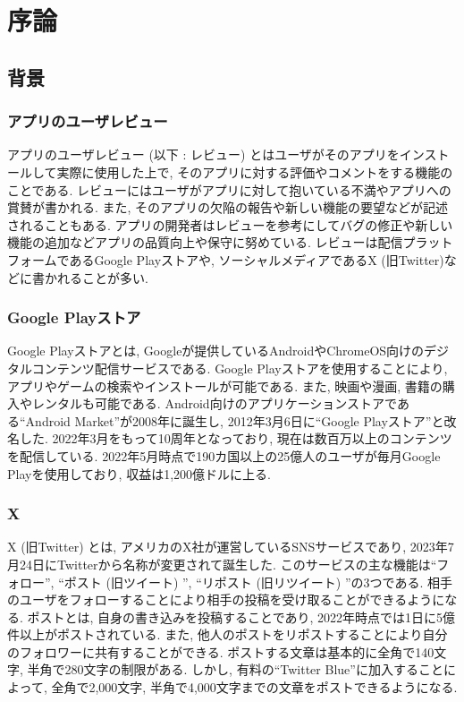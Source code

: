 \chapter{序論}
\label{chap:jyoron}

\section{背景}

\subsection{アプリのユーザレビュー}
アプリのユーザレビュー (以下 : レビュー) とはユーザがそのアプリをインストールして実際に使用した上で, そのアプリに対する評価やコメントをする機能のことである. 
レビューにはユーザがアプリに対して抱いている不満やアプリへの賞賛が書かれる. また, そのアプリの欠陥の報告や新しい機能の要望などが記述されることもある. 
アプリの開発者はレビューを参考にしてバグの修正や新しい機能の追加などアプリの品質向上や保守に努めている. 
レビューは配信プラットフォームであるGoogle Playストアや, ソーシャルメディアであるX (旧Twitter)などに書かれることが多い. 

\subsection{Google Playストア}
Google Playストア\cite{google-play-store}とは, Googleが提供しているAndroidやChromeOS向けのデジタルコンテンツ配信サービスである. Google Playストアを使用することにより, アプリやゲームの検索やインストールが可能である. また, 映画や漫画, 書籍の購入やレンタルも可能である. 
Android向けのアプリケーションストアである``Android Market''が2008年に誕生し, 2012年3月6日に``Google Playストア''と改名した. 2022年3月をもって10周年となっており, 現在は数百万以上のコンテンツを配信している\cite{about-google-play}. 
2022年5月時点で190カ国以上の25億人のユーザが毎月Google Playを使用しており, 収益は1,200億ドルに上る\cite{purnima-kochikar}. 

\subsection{X}
X (旧Twitter) \cite{twitter}とは, アメリカのX社が運営しているSNSサービスであり, 2023年7月24日にTwitterから名称が変更されて誕生した. 
このサービスの主な機能は``フォロー'', ``ポスト (旧ツイート) '', ``リポスト (旧リツイート) ''の3つである. 相手のユーザをフォローすることにより相手の投稿を受け取ることができるようになる. ポストとは, 自身の書き込みを投稿することであり, 2022年時点では1日に5億件以上がポストされている\cite{aboutx}. また, 他人のポストをリポストすることにより自分のフォロワーに共有することができる. 
ポストする文章は基本的に全角で140文字, 半角で280文字の制限がある. しかし, 有料の``Twitter Blue''に加入することによって, 全角で2,000文字, 半角で4,000文字までの文章をポストできるようになる. 

